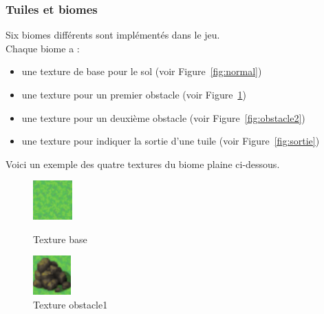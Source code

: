 \documentclass[11pt]{article}
\begin{document}
            \subsubsection{Tuiles et biomes}
            Six biomes différents sont implémentés dans le jeu.\\
            Chaque biome a :
            \begin{itemize}
                \item une texture de base pour le sol (voir Figure~\ref{fig:normal})
                \item une texture pour un premier obstacle (voir Figure~\ref{fig:obstacle1})
                \item une texture pour un deuxième obstacle (voir Figure~\ref{fig:obstacle2})
                \item une texture pour indiquer la sortie d'une tuile (voir Figure~\ref{fig:sortie})
            \end{itemize}
            Voici un exemple des quatre textures du biome plaine ci-dessous. 
            \begin{figure}[H]
                \centering
                \begin{minipage}{0.45\textwidth}
                    \centering
                    \includegraphics[height=1.5cm]{normal.png}
                    \caption{Texture base}
                    \label{fig:normal}
                \end{minipage}
                \hfill
                \begin{minipage}{0.45\textwidth}
                    \centering
                    \includegraphics[height=1.5cm]{obstacle1.png}
                    \caption{Texture obstacle1}
                    \label{fig:obstacle1}
                \end{minipage}
            \end{figure}
\end{document}
